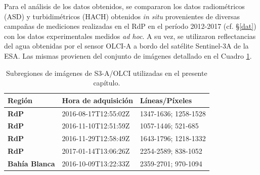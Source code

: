     Para el análisis de los datos obtenidos, se compararon los datos radiométricos (ASD) y turbidimétricos (HACH) obtenidos \textit{in situ} provenientes de diversas campañas de mediciones realizadas en el RdP en el período 2012-2017 (cf. \S \ref{dat}) con los datos experimentales medidos \textit{ad hoc}. A su vez, se utilizaron reflectancias del agua obtenidas por el sensor OLCI-A a bordo del satélite Sentinel-3A de la ESA. Las mismas provienen del conjunto de imágenes detallado en el Cuadro \ref{oil:tab:olci}.


    \begin{table}
        \caption{Subregiones de imágenes de S3-A/OLCI utilizadas en el presente capítulo.}
        \begin{tabular}{|l|l|l|}
        \hline
        \textbf{Región}          & \textbf{Hora de adquisición} & \textbf{Líneas/Píxeles} \\ \hline
        \textbf{RdP} & 2016-08-17T12:55:02Z          & 1347-1636; 1258-1528    \\ \hline
        \textbf{RdP} & 2016-11-10T12:51:59Z          & 1057-1446; 521-685      \\ \hline
        \textbf{RdP} & 2016-11-29T12:58:49Z          & 1643-1796; 1218-1332    \\ \hline
        \textbf{RdP} & 2017-01-14T13:06:26Z          & 2254-2589; 838-1052     \\ \hline
        \textbf{Bahía Blanca}    & 2016-10-09T13:22:33Z          & 2359-2701; 970-1094     \\ \hline
        \end{tabular}
        \label{oil:tab:olci}
    \end{table}

